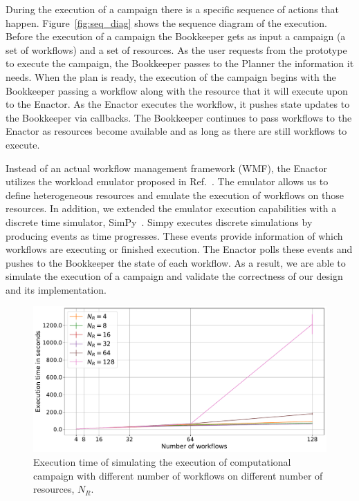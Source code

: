 During the execution of a campaign there is a specific sequence of actions that happen.
Figure~\ref{fig:seq_diag} shows the sequence diagram of the execution.
Before the execution of a campaign the Bookkeeper gets as input a campaign (a set of workflows) and a set of resources.
As the user requests from the prototype to execute the campaign, the Bookkeeper passes to the Planner the information it needs.
When the plan is ready, the execution of the campaign begins with the Bookkeeper passing a workflow along with the resource that it will execute upon to the Enactor.
As the Enactor executes the workflow, it pushes state updates to the Bookkeeper via callbacks.
The Bookkeeper continues to pass workflows to the Enactor as resources become available and as long as there are still workflows to execute.

Instead of an actual workflow management framework (WMF), the Enactor utilizes the workload emulator proposed in Ref.~\cite{balasubramanian2019programming}.
The emulator allows us to define heterogeneous resources and emulate the execution of workflows on those resources.
In addition, we extended the emulator execution capabilities with a discrete time simulator, SimPy~\cite{simpy}.
Simpy executes discrete simulations by producing events as time progresses.
These events provide information of which workflows are executing or finished execution.
The Enactor polls these events and pushes to the Bookkeeper the state of each workflow.
As a result, we are able to simulate the execution of a campaign and validate the correctness of our design and its implementation.

\begin{figure}[t]
    \centering
    \includegraphics[width=.95\textwidth]{figures/manager/SimTimeWork.pdf}
    \caption{Execution time of simulating the execution of computational campaign with different number of workflows on different number of resources, $N_R$.}
    \label{fig:cm_char}
\end{figure}

